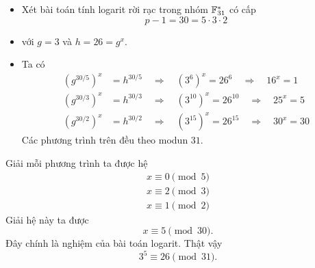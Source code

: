 \begin{frame}
	\begin{xmpl}
		\begin{itemize}
			\item<+-> Xét bài toán tính logarit rời rạc trong nhóm $\mathbb{F}_{31}^*$ có cấp $$p -1 = 30 = 5\cdot 3\cdot 2 $$
			\item<+-> với $g = 3$ và $h=26 = g^x$.
			\item<+-> Ta có 
			\begin{align*}
				\left(g^{30/5}\right)^x &= h^{30/5}\quad \Rightarrow \quad (3^6)^x = 26^6 \quad \Rightarrow\quad 16^x = 1\\
				 \left(g^{30/3}\right)^x &= h^{30/3}\quad \Rightarrow\quad  (3^{10})^x = 26^{10}\quad \Rightarrow\quad 25^x = 5\\
				 \left(g^{30/2}\right)^x &= h^{30/2}\quad  \Rightarrow\quad (3^{15})^x = 26^{15}\quad \Rightarrow\quad 30^x = 30
			\end{align*} 
			Các phương trình trên đều theo modun $31$.
		\end{itemize}
	\end{xmpl}
\end{frame}
\begin{frame}
	\begin{xmpl}[tiếp]
		Giải mỗi phương trình ta được hệ 
\begin{align*}
	x \equiv 0 \pmod{5} \\
	x \equiv 2 \pmod{3}\\
	x \equiv 1 \pmod{2}
\end{align*}
Giải hệ này ta được 
\[
	x \equiv 5 \pmod{30}.
\]
Đây chính là nghiệm của bài toán logarit. Thật vậy 
\[
	3^5 \equiv 26 \pmod{31}.
\]
	\end{xmpl}
\end{frame}




